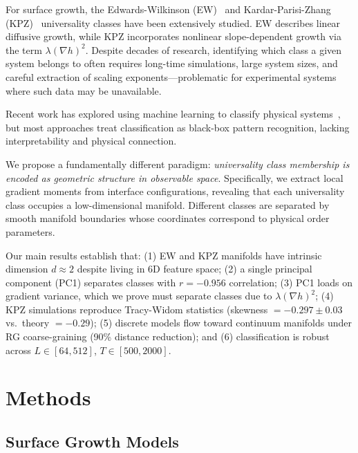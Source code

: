 \documentclass[aps,prl,twocolumn,superscriptaddress,showpacs]{revtex4-2}
\begin{document}
For surface growth, the Edwards-Wilkinson (EW)~\cite{Edwards1982} and Kardar-Parisi-Zhang (KPZ)~\cite{Kardar1986} universality classes have been extensively studied. EW describes linear diffusive growth, while KPZ incorporates nonlinear slope-dependent growth via the term $\lambda(\nabla h)^2$. Despite decades of research, identifying which class a given system belongs to often requires long-time simulations, large system sizes, and careful extraction of scaling exponents---problematic for experimental systems where such data may be unavailable.

Recent work has explored using machine learning to classify physical systems~\cite{Carrasquilla2017,Wang2016,Wetzel2017}, but most approaches treat classification as black-box pattern recognition, lacking interpretability and physical connection.

We propose a fundamentally different paradigm: \emph{universality class membership is encoded as geometric structure in observable space}. Specifically, we extract local gradient moments from interface configurations, revealing that each universality class occupies a low-dimensional manifold. Different classes are separated by smooth manifold boundaries whose coordinates correspond to physical order parameters.

Our main results establish that: (1) EW and KPZ manifolds have intrinsic dimension $d \approx 2$ despite living in 6D feature space; (2) a single principal component (PC1) separates classes with $r = -0.956$ correlation; (3) PC1 loads on gradient variance, which we prove must separate classes due to $\lambda(\nabla h)^2$; (4) KPZ simulations reproduce Tracy-Widom statistics (skewness $= -0.297 \pm 0.03$ vs.\ theory $= -0.29$); (5) discrete models flow toward continuum manifolds under RG coarse-graining (90\% distance reduction); and (6) classification is robust across $L \in [64, 512]$, $T \in [500, 2000]$.

\section{Methods}

\subsection{Surface Growth Models}
\end{document}
